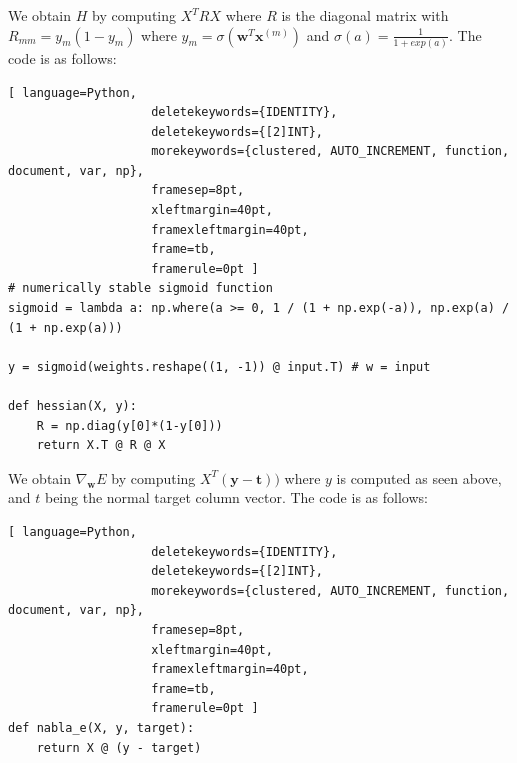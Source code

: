 \documentclass[a4paper,11pt,oneside]{article}
\begin{document}
We obtain $H$ by computing $X^TRX$ where $R$ is the diagonal matrix with $R_{mm} = y_m(1 - y_m)$ where $y_m = \sigma(\textbf{w}^T\textbf{x}^{(m)})$ and $\sigma(a) = \frac{1}{1 + exp(a)}$. The code is as follows:
\begin{lstlisting}[ language=Python,
                    deletekeywords={IDENTITY},
                    deletekeywords={[2]INT},
                    morekeywords={clustered, AUTO_INCREMENT, function, document, var, np},
                    framesep=8pt,
                    xleftmargin=40pt,
                    framexleftmargin=40pt,
                    frame=tb,
                    framerule=0pt ]
# numerically stable sigmoid function
sigmoid = lambda a: np.where(a >= 0, 1 / (1 + np.exp(-a)), np.exp(a) / (1 + np.exp(a)))                    

y = sigmoid(weights.reshape((1, -1)) @ input.T) # w = input
                    
def hessian(X, y):
    R = np.diag(y[0]*(1-y[0]))
    return X.T @ R @ X
\end{lstlisting}

We obtain $\nabla_\textbf{w}E$ by computing $X^T(\textbf{y} - \textbf{t}))$ where $y$ is computed as seen above, and $t$ being the normal target column vector. The code is as follows:
\begin{lstlisting}[ language=Python,
                    deletekeywords={IDENTITY},
                    deletekeywords={[2]INT},
                    morekeywords={clustered, AUTO_INCREMENT, function, document, var, np},
                    framesep=8pt,
                    xleftmargin=40pt,
                    framexleftmargin=40pt,
                    frame=tb,
                    framerule=0pt ]
def nabla_e(X, y, target):
    return X @ (y - target)
\end{lstlisting}
\end{document}
